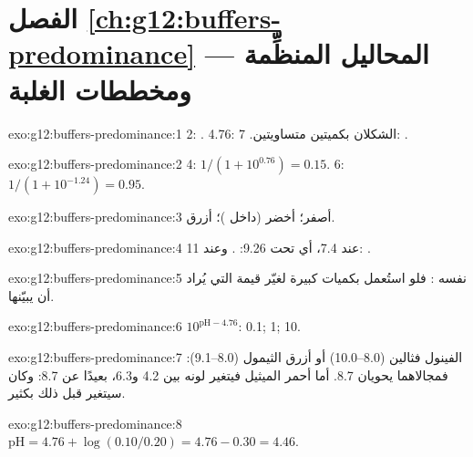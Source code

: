 \section*{الفصل \ref{ch:g12:buffers-predominance} --- المحاليل المنظِّمة ومخططات الغلبة}

\begin{solution}{exo:g12:buffers-predominance:1}
 2: .  4.76: الشكلان بكميتين متساويتين.  7: .
\end{solution}

\begin{solution}{exo:g12:buffers-predominance:2}
 4: $1/(1 + 10^{0.76}) = 0.15$.  6: $1/(1 + 10^{-1.24}) = 0.95$.
\end{solution}

\begin{solution}{exo:g12:buffers-predominance:3}
أصفر؛ أخضر (داخل )؛ أزرق.
\end{solution}

\begin{solution}{exo:g12:buffers-predominance:4}
عند  7.4، أي تحت 9.26: . وعند  11: .
\end{solution}

\begin{solution}{exo:g12:buffers-predominance:5}
 نفسه : فلو استُعمل بكميات كبيرة
لغيّر قيمة  التي يُراد أن يبيّنها.
\end{solution}

\begin{solution}{exo:g12:buffers-predominance:6}
$10^{\mathrm{pH} - 4.76}$: 0.1; 1; 10.
\end{solution}

\begin{solution}{exo:g12:buffers-predominance:7}
الفينول فثالين (8.0--10.0) أو أزرق الثيمول (8.0--9.1): فمجالاهما
يحويان 8.7. أما أحمر الميثيل فيتغير لونه بين 4.2 و6.3، بعيدًا عن 8.7: وكان
سيتغير قبل ذلك بكثير.
\end{solution}

\begin{solution}{exo:g12:buffers-predominance:8}
$\mathrm{pH} = 4.76 + \log(0.10/0.20) = 4.76 - 0.30 = 4.46$.
\end{solution}


